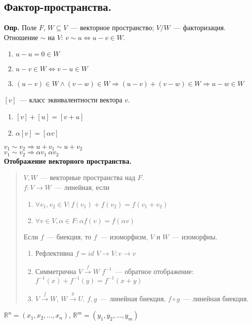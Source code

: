 \documentclass{article}
\begin{document}
	\subsection{Фактор-пространства.}
	\textbf{Опр.} Поле $F$, $W \subseteq V$~--- векторное пространство; $V / W$~--- факторизация. Отношение $\sim$ на $V$: $v \sim u \Leftrightarrow u - v \in W$.
	\begin{enumerate}
		\item $u - u = 0 \in W$
		\item $u - v \in W \Leftrightarrow v - u \in W$
		\item $(u - v) \in W \wedge (v - w) \in W \Rightarrow (u - v) + (v - w) \in W \Rightarrow u - w \in W$
	\end{enumerate}
	$[v]$~--- класс эквивалентности вектора $v$.
	\begin{enumerate}
		\item $[v] + [u] = [v + u]$
		\item $\alpha [v] = [\alpha v]$
	\end{enumerate}
	$v_1 \sim v_2 \Rightarrow u + v_1 \sim u + v_2$ \\
	$v_1 \sim v_2 \Rightarrow \alpha v_1 ~ \alpha v_2$ \\
	\textbf{Отображение векторного пространства.}
	\begin{quote}
		$V, W$~--- векторные пространства над $F$. \\
		$f: V \rightarrow W$~--- линейная, если
		\begin{enumerate}
			\item $\forall v_1, v_2 \in V: f(v_1) + f(v_2) = f(v_1 + v_2)$
			\item $\forall v \in V, \alpha \in F: \alpha f(v) = f(\alpha v)$
		\end{enumerate}
		Если $f$~--- биекция, то $f$~--- изоморфизм, $V$ и $W$~--- изоморфны.
		\begin{enumerate}
			\item Рефлективна $f = id$ $V \rightarrow V: v \rightarrow v$
			\item Симметрична $V \xrightarrow{f} W$ $f^{-1}$~--- обратное отображение: $f^{-1}(x) + f^{-1}(y) = f^{-1}(x + y)$
			\item $V \xrightarrow{f} W$, $W \xrightarrow{g} U$. $f, g$~--- линейная биекция, $f \circ g$~--- линейная биекция.
		\end{enumerate}
	\end{quote}
	$\mathbb{R}^n = (x_1, x_2, \dots, x_n)$, $\mathbb{R}^m = (y_1, y_2, \dots, y_m)$ \\
\end{document}
